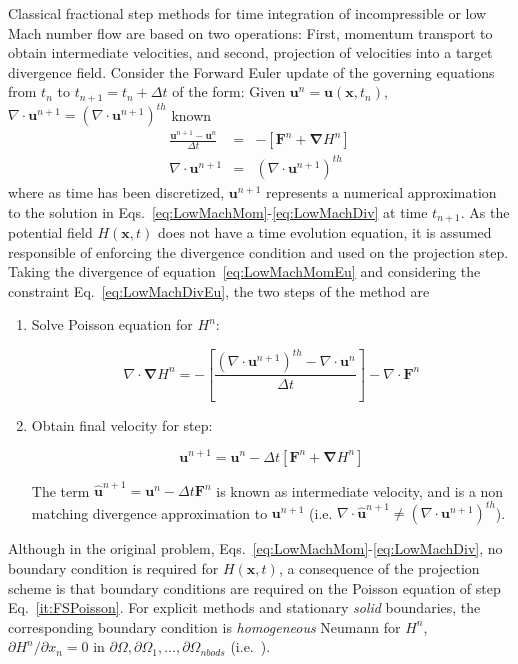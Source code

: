 Classical fractional step methods for time integration of incompressible or low Mach number flow are based on two operations: First, momentum transport to obtain intermediate velocities, and second, projection of velocities into a target divergence field. Consider the Forward Euler update of the governing equations from $t_n$ to $t_{n+1}=t_n + \Delta t$ of the form: Given $ \mathbf{u}^n=\mathbf{u}(\mathbf{x},t_n)$, $\nabla \cdot \mathbf{u}^{n+1} = \left( \nabla \cdot \mathbf{u}^{n+1} \right)^{th}$ known
%
\begin{eqnarray}
  \frac{\mathbf{u}^{n+1}-\mathbf{u}^{n}}{\Delta t} &=& - \left[ \mathbf{F}^n +  \boldsymbol{\nabla} H^n \right] \label{eq:LowMachMomEu}\\
  \nabla \cdot \mathbf{u}^{n+1} &=& \left( \nabla \cdot \mathbf{u}^{n+1} \right)^{th} \label{eq:LowMachDivEu}
\end{eqnarray}
%
where as time has been discretized, $\mathbf{u}^{n+1}$ represents a numerical approximation to the solution in Eqs.~\eqref{eq:LowMachMom}-\eqref{eq:LowMachDiv} at time $t_{n+1}$. As the potential field $H(\mathbf{x},t)$ does not have a time evolution equation, it is assumed responsible of enforcing the divergence condition and used on the projection step. Taking the divergence of equation~\eqref{eq:LowMachMomEu} and considering  the constraint Eq.~\eqref{eq:LowMachDivEu}, the two steps of the method are
%
\begin{enumerate}
  \item Solve Poisson equation for $H^n$:

\begin{equation}
   \nabla \cdot \boldsymbol{\nabla} H^n = - \left[ \frac{\left( \nabla \cdot \mathbf{u}^{n+1} \right)^{th} - \nabla \cdot \mathbf{u}^{n}}{\Delta t} \right] - \nabla \cdot \mathbf{F}^n \label{it:FSPoisson}
\end{equation}

  \item Obtain final velocity for step:

  \begin{equation}
     \mathbf{u}^{n+1} = \mathbf{u}^{n} - \Delta t \left[ \mathbf{F}^n +  \boldsymbol{\nabla} H^n \right] \label{it:FSProject}
   \end{equation}

   The term $\hat{\mathbf{u}}^{n+1}=\mathbf{u}^{n} - \Delta t \mathbf{F}^n$ is known as intermediate velocity, and is a non matching divergence approximation to $\mathbf{u}^{n+1}$ (i.e. $\nabla \cdot \hat{\mathbf{u}}^{n+1} \neq \left( \nabla \cdot \mathbf{u}^{n+1} \right)^{th}$).
\end{enumerate}
%
Although in the original problem, Eqs.~\eqref{eq:LowMachMom}-\eqref{eq:LowMachDiv}, no boundary condition is required for $H(\mathbf{x},t)$, a consequence of the projection scheme is that boundary conditions are required on the Poisson equation of step Eq.~\eqref{it:FSPoisson}. For explicit methods and stationary \textit{solid} boundaries, the corresponding boundary condition is \textit{homogeneous} Neumann for $H^n$, $\partial H^n / \partial x_n =0$ in $\partial \Omega,\partial \Omega_1,...,\partial \Omega_{nbods}$ (i.e.~\cite{Perot:1993}).


